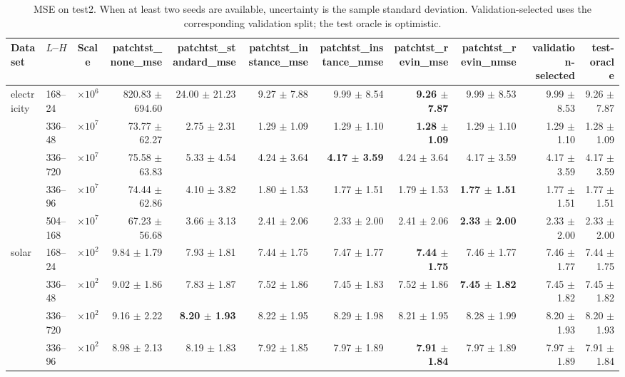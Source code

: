 \begin{table}[htbp]
\centering
\caption{MSE on test2. When at least two seeds are available, uncertainty is the sample standard deviation. Validation-selected uses the corresponding validation split; the test oracle is optimistic.}
\begin{tabular}{llcrrrrrrr|r}
\toprule
Dataset & $L$--$H$ & Scale & patchtst\_none\_mse & patchtst\_standard\_mse & patchtst\_instance\_mse & patchtst\_instance\_nmse & patchtst\_revin\_mse & patchtst\_revin\_nmse & validation-selected & test-oracle \\
\midrule
electricity & 168--24 & $\times 10^{6}$ & 820.83 $\pm$ 694.60 & 24.00 $\pm$ 21.23 & 9.27 $\pm$ 7.88 & 9.99 $\pm$ 8.54 & \textbf{9.26 $\pm$ 7.87} & 9.99 $\pm$ 8.53 & 9.99 $\pm$ 8.53 & 9.26 $\pm$ 7.87 \\
 & 336--48 & $\times 10^{7}$ & 73.77 $\pm$ 62.27 & 2.75 $\pm$ 2.31 & 1.29 $\pm$ 1.09 & 1.29 $\pm$ 1.10 & \textbf{1.28 $\pm$ 1.09} & 1.29 $\pm$ 1.10 & 1.29 $\pm$ 1.10 & 1.28 $\pm$ 1.09 \\
 & 336--720 & $\times 10^{7}$ & 75.58 $\pm$ 63.83 & 5.33 $\pm$ 4.54 & 4.24 $\pm$ 3.64 & \textbf{4.17 $\pm$ 3.59} & 4.24 $\pm$ 3.64 & 4.17 $\pm$ 3.59 & 4.17 $\pm$ 3.59 & 4.17 $\pm$ 3.59 \\
 & 336--96 & $\times 10^{7}$ & 74.44 $\pm$ 62.86 & 4.10 $\pm$ 3.82 & 1.80 $\pm$ 1.53 & 1.77 $\pm$ 1.51 & 1.79 $\pm$ 1.53 & \textbf{1.77 $\pm$ 1.51} & 1.77 $\pm$ 1.51 & 1.77 $\pm$ 1.51 \\
 & 504--168 & $\times 10^{7}$ & 67.23 $\pm$ 56.68 & 3.66 $\pm$ 3.13 & 2.41 $\pm$ 2.06 & 2.33 $\pm$ 2.00 & 2.41 $\pm$ 2.06 & \textbf{2.33 $\pm$ 2.00} & 2.33 $\pm$ 2.00 & 2.33 $\pm$ 2.00 \\
\midrule
solar & 168--24 & $\times 10^{2}$ & 9.84 $\pm$ 1.79 & 7.93 $\pm$ 1.81 & 7.44 $\pm$ 1.75 & 7.47 $\pm$ 1.77 & \textbf{7.44 $\pm$ 1.75} & 7.46 $\pm$ 1.77 & 7.46 $\pm$ 1.77 & 7.44 $\pm$ 1.75 \\
 & 336--48 & $\times 10^{2}$ & 9.02 $\pm$ 1.86 & 7.83 $\pm$ 1.87 & 7.52 $\pm$ 1.86 & 7.45 $\pm$ 1.83 & 7.52 $\pm$ 1.86 & \textbf{7.45 $\pm$ 1.82} & 7.45 $\pm$ 1.82 & 7.45 $\pm$ 1.82 \\
 & 336--720 & $\times 10^{2}$ & 9.16 $\pm$ 2.22 & \textbf{8.20 $\pm$ 1.93} & 8.22 $\pm$ 1.95 & 8.29 $\pm$ 1.98 & 8.21 $\pm$ 1.95 & 8.28 $\pm$ 1.99 & 8.20 $\pm$ 1.93 & 8.20 $\pm$ 1.93 \\
 & 336--96 & $\times 10^{2}$ & 8.98 $\pm$ 2.13 & 8.19 $\pm$ 1.83 & 7.92 $\pm$ 1.85 & 7.97 $\pm$ 1.89 & \textbf{7.91 $\pm$ 1.84} & 7.97 $\pm$ 1.89 & 7.97 $\pm$ 1.89 & 7.91 $\pm$ 1.84 \\

\end{tabular}
\end{table}
